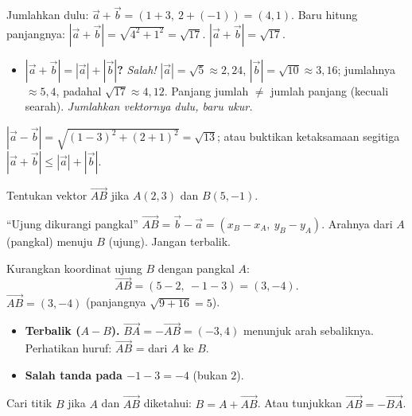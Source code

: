 \jawab
{} Jumlahkan dulu: $\vec a+\vec b=(1+3,\ 2+(-1))=(4,1)$.
 Baru hitung panjangnya: $|\vec a+\vec b|=\sqrt{4^2+1^2}=\sqrt{17}$.
\jadi $|\vec a+\vec b|=\sqrt{17}$.

\begin{jebakan}
\begin{itemize}[leftmargin=*,topsep=2pt]
  \item \textbf{$|\vec a+\vec b|=|\vec a|+|\vec b|$?} \emph{Salah!}
  $|\vec a|=\sqrt5\approx2{,}24$, $|\vec b|=\sqrt{10}\approx3{,}16$; jumlahnya
  $\approx5{,}4$, padahal $\sqrt{17}\approx4{,}12$. Panjang jumlah $\ne$ jumlah
  panjang (kecuali searah). \emph{Jumlahkan vektornya dulu, baru ukur.}
\end{itemize}
\end{jebakan}

\begin{variasi}
$|\vec a-\vec b|=\sqrt{(1-3)^2+(2+1)^2}=\sqrt{13}$; atau buktikan
ketaksamaan segitiga $|\vec a+\vec b|\le|\vec a|+|\vec b|$.
\end{variasi}

\begin{soalbox}{}
Tentukan vektor $\vec{AB}$ jika $A(2,3)$ dan $B(5,-1)$.
\end{soalbox}

\begin{ingat}{``Ujung dikurangi pangkal''}
$\vec{AB}=\vec b-\vec a=(x_B-x_A,\ y_B-y_A)$. Arahnya dari $A$ (pangkal) menuju
$B$ (ujung). Jangan terbalik.
\end{ingat}

\jawab
{} Kurangkan koordinat ujung $B$ dengan pangkal $A$:
\[
\vec{AB}=(5-2,\ -1-3)=(3,-4).
\]
\jadi $\vec{AB}=(3,-4)$ (panjangnya $\sqrt{9+16}=5$).

\begin{jebakan}
\begin{itemize}[leftmargin=*,topsep=2pt]
  \item \textbf{Terbalik ($A-B$).} $\vec{BA}=-\vec{AB}=(-3,4)$ menunjuk arah
  sebaliknya. Perhatikan huruf: $\vec{AB}$ = dari $A$ ke $B$.
  \item \textbf{Salah tanda pada $-1-3=-4$} (bukan $2$).
\end{itemize}
\end{jebakan}

\begin{variasi}
Cari titik $B$ jika $A$ dan $\vec{AB}$ diketahui: $B=A+\vec{AB}$. Atau tunjukkan
$\vec{AB}=-\vec{BA}$.
\end{variasi}

